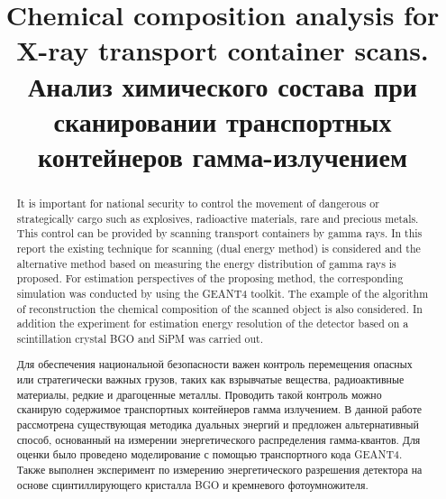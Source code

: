 \documentclass[a4paper]{panl}
\begin{document}

\title{Chemical composition analysis for X-ray transport container scans.  \\ Анализ химического состава при сканировании транспортных контейнеров гамма-излучением}
\maketitle
{}
\vspace{-3mm}

\begin{abstract}
It is important for national security to control the movement of dangerous or strategically cargo such as explosives, radioactive materials, rare and precious metals. This control can be provided by scanning transport containers by gamma rays.
In this report the existing technique for scanning (dual energy method) is considered and the alternative method based on measuring the energy distribution of gamma rays is proposed. For estimation perspectives of the proposing method, the  corresponding simulation was conducted by using the GEANT4 toolkit. The example of the algorithm of reconstruction the chemical composition of the scanned object is also considered. In addition the experiment for estimation energy resolution of the detector based on a scintillation crystal BGO and SiPM was carried out.\\
\vspace{0.2cm}

Для обеспечения национальной безопасности важен контроль перемещения опасных или стратегически важных грузов, таких как взрывчатые вещества, радиоактивные материалы, редкие и драгоценные металлы. Проводить такой контроль можно сканирую содержимое   транспортных контейнеров гамма излучением. В данной работе рассмотрена существующая методика дуальных энергий и предложен альтернативный способ, основанный на измерении энергетического распределения гамма-квантов. Для оценки было проведено моделирование с помощью транспортного кода GEANT4.  Также выполнен эксперимент по измерению энергетического разрешения детектора на основе сцинтиллирующего кристалла BGO и кремневого фотоумножителя. 
\end{abstract}
\vspace*{6pt}
\end{document}
